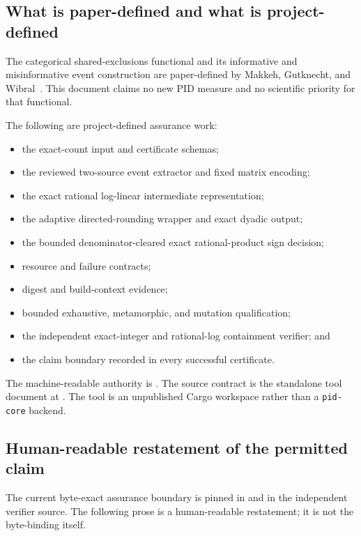 \documentclass[11pt]{article}
\theoremstyle{definition}
\begin{document}
\subsection{What is paper-defined and what is project-defined}

The categorical shared-exclusions functional and its informative and misinformative event
construction are paper-defined by Makkeh, Gutknecht, and Wibral~\cite{makkeh2021}.  This
document claims no new PID measure and no scientific priority for that functional.

The following are project-defined assurance work:
\begin{itemize}[leftmargin=*]
  \item the exact-count input and certificate schemas;
  \item the reviewed two-source event extractor and fixed matrix encoding;
  \item the exact rational log-linear intermediate representation;
  \item the adaptive directed-rounding wrapper and exact dyadic output;
  \item the bounded denominator-cleared exact rational-product sign decision;
  \item resource and failure contracts;
  \item digest and build-context evidence;
  \item bounded exhaustive, metamorphic, and mutation qualification;
  \item the independent exact-integer and rational-log containment verifier; and
  \item the claim boundary recorded in every successful certificate.
\end{itemize}

The machine-readable authority is .  The source contract is the
standalone tool document at .  The tool is an
unpublished Cargo workspace rather than a \texttt{pid-core} backend.

\subsection{Human-readable restatement of the permitted claim}

The current byte-exact assurance boundary is pinned in
 and in the independent verifier source.
The following prose is a human-readable restatement; it is not the byte-binding itself.
\end{document}
